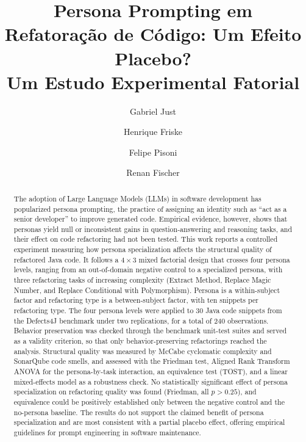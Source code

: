 \documentclass[10pt,conference,a4paper,twocolumn]{article}
\title{\textbf{\LARGE Persona Prompting em Refatoração de Código: Um Efeito Placebo?\\ Um Estudo Experimental Fatorial}}
\author[1]{Gabriel Just}
\author[1]{Henrique Friske}
\author[1]{Felipe Pisoni}
\author[1]{Renan Fischer}
\affil[1]{Programa de Engenharia de Software, Universidade Regional do Noroeste do Estado do Rio Grande do Sul (UNIJUÍ), Ijuí, Brasil}
\date{}
\begin{document}
\maketitle

\begin{otherlanguage}{english}
\begin{abstract}
The adoption of Large Language Models (LLMs) in software development has popularized persona prompting, the practice of assigning an identity such as ``act as a senior developer'' to improve generated code. Empirical evidence, however, shows that personas yield null or inconsistent gains in question-answering and reasoning tasks, and their effect on code refactoring had not been tested. This work reports a controlled experiment measuring how persona specialization affects the structural quality of refactored Java code. It follows a $4 \times 3$ mixed factorial design that crosses four persona levels, ranging from an out-of-domain negative control to a specialized persona, with three refactoring tasks of increasing complexity (Extract Method, Replace Magic Number, and Replace Conditional with Polymorphism). Persona is a within-subject factor and refactoring type is a between-subject factor, with ten snippets per refactoring type. The four persona levels were applied to 30 Java code snippets from the Defects4J benchmark under two replications, for a total of 240 observations. Behavior preservation was checked through the benchmark unit-test suites and served as a validity criterion, so that only behavior-preserving refactorings reached the analysis. Structural quality was measured by McCabe cyclomatic complexity and SonarQube code smells, and assessed with the Friedman test, Aligned Rank Transform ANOVA for the persona-by-task interaction, an equivalence test (TOST), and a linear mixed-effects model as a robustness check. No statistically significant effect of persona specialization on refactoring quality was found (Friedman, all $p>0.25$), and equivalence could be positively established only between the negative control and the no-persona baseline. The results do not support the claimed benefit of persona specialization and are most consistent with a partial placebo effect, offering empirical guidelines for prompt engineering in software maintenance.
\end{abstract}
\end{otherlanguage}
\end{document}
